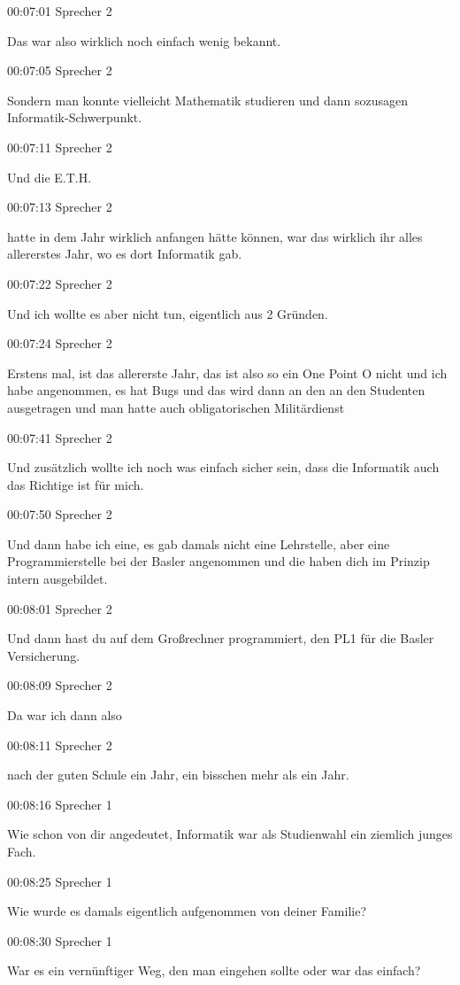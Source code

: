 00:07:01 Sprecher 2

Das war also wirklich noch einfach wenig bekannt.

00:07:05 Sprecher 2

Sondern man konnte vielleicht Mathematik studieren und dann sozusagen
Informatik-Schwerpunkt.

00:07:11 Sprecher 2

Und die E.T.H.

00:07:13 Sprecher 2

hatte in dem Jahr wirklich anfangen hätte können, war das wirklich ihr
alles allererstes Jahr, wo es dort Informatik gab.

00:07:22 Sprecher 2

Und ich wollte es aber nicht tun, eigentlich aus 2 Gründen.

00:07:24 Sprecher 2

Erstens mal, ist das allererste Jahr, das ist also so ein One Point O
nicht und ich habe angenommen, es hat Bugs und das wird dann an den an
den Studenten ausgetragen und man hatte auch obligatorischen
Militärdienst

00:07:41 Sprecher 2

Und zusätzlich wollte ich noch was einfach sicher sein, dass die
Informatik auch das Richtige ist für mich.

00:07:50 Sprecher 2

Und dann habe ich eine, es gab damals nicht eine Lehrstelle, aber eine
Programmierstelle bei der Basler angenommen und die haben dich im
Prinzip intern ausgebildet.

00:08:01 Sprecher 2

Und dann hast du auf dem Großrechner programmiert, den PL1 für die
Basler Versicherung.

00:08:09 Sprecher 2

Da war ich dann also

00:08:11 Sprecher 2

nach der guten Schule ein Jahr, ein bisschen mehr als ein Jahr.

00:08:16 Sprecher 1

Wie schon von dir angedeutet, Informatik war als Studienwahl ein
ziemlich junges Fach.

00:08:25 Sprecher 1

Wie wurde es damals eigentlich aufgenommen von deiner Familie?

00:08:30 Sprecher 1

War es ein vernünftiger Weg, den man eingehen sollte oder war das
einfach?

